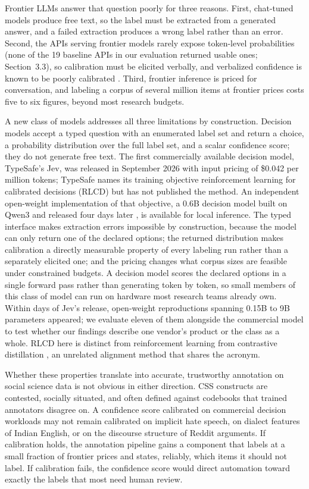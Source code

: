 \documentclass[11pt]{article}
\begin{document}
Frontier LLMs answer that question poorly for three reasons. First, chat-tuned models produce free text, so the label must be extracted from a generated answer, and a failed extraction produces a wrong label rather than an error. Second, the APIs serving frontier models rarely expose token-level probabilities (none of the 19 baseline APIs in our evaluation returned usable ones; Section~3.3), so calibration must be elicited verbally, and verbalized confidence is known to be poorly calibrated \citep{xiong2023can}. Third, frontier inference is priced for conversation, and labeling a corpus of several million items at frontier prices costs five to six figures, beyond most research budgets.

A new class of models addresses all three limitations by construction. Decision models accept a typed question with an enumerated label set and return a choice, a probability distribution over the full label set, and a scalar confidence score; they do not generate free text. The first commercially available decision model, TypeSafe's Jev, was released in September 2026 with input pricing of \$0.042 per million tokens; TypeSafe names its training objective reinforcement learning for calibrated decisions (RLCD) but has not published the method. An independent open-weight implementation of that objective, a 0.6B decision model built on Qwen3 and released four days later \citep{maio2026rlcd}, is available for local inference. The typed interface makes extraction errors impossible by construction, because the model can only return one of the declared options; the returned distribution makes calibration a directly measurable property of every labeling run rather than a separately elicited one; and the pricing changes what corpus sizes are feasible under constrained budgets. A decision model scores the declared options in a single forward pass rather than generating token by token, so small members of this class of model can run on hardware most research teams already own. Within days of Jev's release, open-weight reproductions spanning 0.15B to 9B parameters appeared; we evaluate eleven of them alongside the commercial model to test whether our findings describe one vendor's product or the class as a whole. RLCD here is distinct from reinforcement learning from contrastive distillation \citep{yang2023rlcd}, an unrelated alignment method that shares the acronym.

Whether these properties translate into accurate, trustworthy annotation on social science data is not obvious in either direction. CSS constructs are contested, socially situated, and often defined against codebooks that trained annotators disagree on. A confidence score calibrated on commercial decision workloads may not remain calibrated on implicit hate speech, on dialect features of Indian English, or on the discourse structure of Reddit arguments. If calibration holds, the annotation pipeline gains a component that labels at a small fraction of frontier prices and states, reliably, which items it should not label. If calibration fails, the confidence score would direct automation toward exactly the labels that most need human review.
\end{document}
